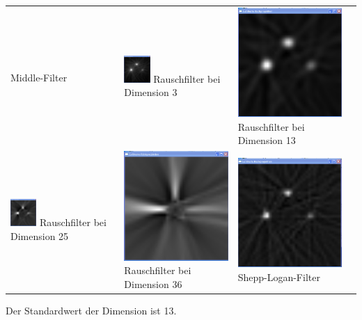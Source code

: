 \begin{center}
\begin{longtable}{p{4.0cm}p{4.0cm}p{4.0cm}l}
                  Middle-Filter
                  &
                  \includegraphics[width=0.25\textwidth, height=0.15\textheight]{pic/Einzelfenster_Bilder/unbekannte_Quelle/unbek5_rausch3.png}
                  Rauschfilter bei Dimension 3
                  & 
                  \includegraphics[width=.25\textwidth, height=0.15\textheight]{pic/Einzelfenster_Bilder/unbekannte_Quelle/unbek5_rausch13.png}               
                  Rauschfilter bei Dimension 13\\
                  \includegraphics[width=0.25\textwidth, height=0.15\textheight]{pic/Einzelfenster_Bilder/unbekannte_Quelle/unbek5_rausch25.png}
                  Rauschfilter bei Dimension 25
                  &
                  \includegraphics[width=.25\textwidth, height=0.15\textheight]{pic/Einzelfenster_Bilder/unbekannte_Quelle/unbek5_rausch36.png} 
                  Rauschfilter bei Dimension 36
                  &
                  \includegraphics[width=.25\textwidth, height=0.15\textheight]{pic/Einzelfenster_Bilder/unbekannte_Quelle/unbek5_shepp-logan.png}
                  Shepp-Logan-Filter
                \end{longtable}
            \end{center}
            \vspace{5mm}
            Der Standardwert der Dimension ist 13.      
                   

